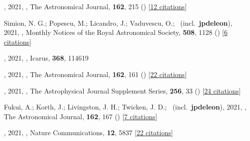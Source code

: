 \item[{\color{numcolor}\scriptsize152}] , 2021, , The Astronomical Journal, \textbf{162}, 215 () [\href{https://ui.adsabs.harvard.edu/abs/2021AJ....162..215S}{12 citations}]

\item[{\color{numcolor}\scriptsize151}] Simion, N. G.; Popescu, M.; Licandro, J.; Vaduvescu, O.; \etal\ (incl.\ \textbf{jpdeleon}), 2021, , Monthly Notices of the Royal Astronomical Society, \textbf{508}, 1128 () [\href{https://ui.adsabs.harvard.edu/abs/2021MNRAS.508.1128S}{6 citations}]

\item[{\color{numcolor}\scriptsize150}] , 2021, , Icarus, \textbf{368}, 114619

\item[{\color{numcolor}\scriptsize149}] , 2021, , The Astronomical Journal, \textbf{162}, 161 () [\href{https://ui.adsabs.harvard.edu/abs/2021AJ....162..161H}{22 citations}]

\item[{\color{numcolor}\scriptsize148}] , 2021, , The Astrophysical Journal Supplement Series, \textbf{256}, 33 () [\href{https://ui.adsabs.harvard.edu/abs/2021ApJS..256...33T}{24 citations}]

\item[{\color{numcolor}\scriptsize147}] Fukui, A.; Korth, J.; Livingston, J. H.; Twicken, J. D.; \etal\ (incl.\ \textbf{jpdeleon}), 2021, , The Astronomical Journal, \textbf{162}, 167 () [\href{https://ui.adsabs.harvard.edu/abs/2021AJ....162..167F}{7 citations}]

\item[{\color{numcolor}\scriptsize146}] , 2021, , Nature Communications, \textbf{12}, 5837 [\href{https://ui.adsabs.harvard.edu/abs/2021NatCo..12.5837T}{22 citations}]

